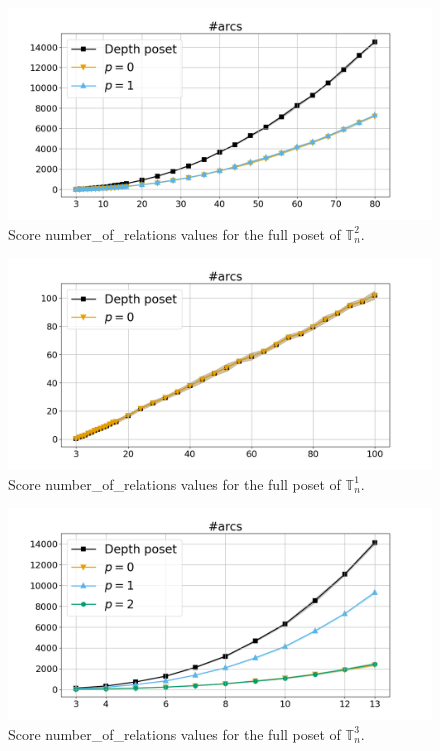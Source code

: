 \documentclass{article}
\begin{document}
    \begin{figure}[h!]
        \centering
        \hspace*{-0.24\textwidth}
        \includegraphics[width=1.4\textwidth]{pics/extended torus scores/score=number-of-relations, dim=2, object=full.png}
        \caption{Score number\_of\_relations values for the full poset of $\mathbb{T}_n^{2}$.}
        \label{fig:numberofrelations-full2}
    \end{figure}
    \begin{figure}[h!]
        \centering
        \hspace*{-0.24\textwidth}
        \includegraphics[width=1.4\textwidth]{pics/extended torus scores/score=number-of-relations, dim=1, object=full.png}
        \caption{Score number\_of\_relations values for the full poset of $\mathbb{T}_n^{1}$.}
        \label{fig:numberofrelations-full1}
    \end{figure}
    \begin{figure}[h!]
        \centering
        \hspace*{-0.24\textwidth}
        \includegraphics[width=1.4\textwidth]{pics/extended torus scores/score=number-of-relations, dim=3, object=full.png}
        \caption{Score number\_of\_relations values for the full poset of $\mathbb{T}_n^{3}$.}
        \label{fig:numberofrelations-full3}
    \end{figure}
\end{document}
